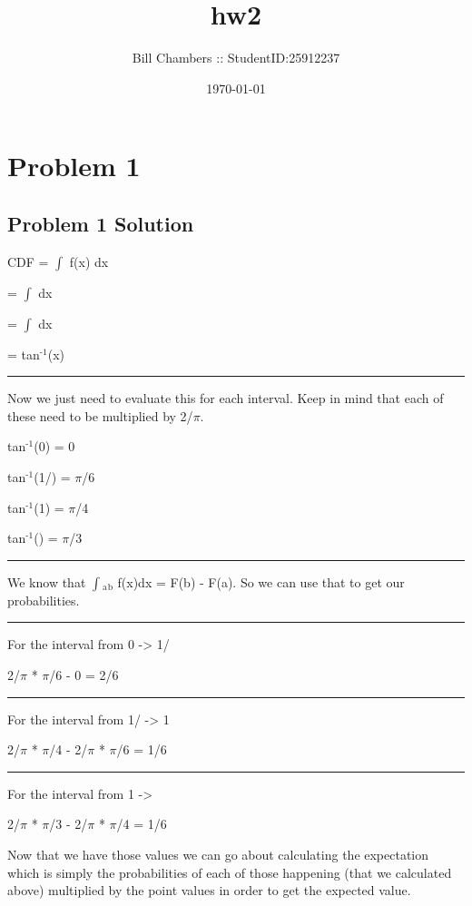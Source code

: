 \documentclass[11pt]{article}
\author{Bill Chambers :: StudentID:25912237}
\date{\today}
\title{hw2}
\begin{document}
\maketitle
\tableofcontents

\newpage

\section{Problem 1}
\label{sec-1}

\subsection{Problem 1 Solution}
\label{sec-1-1}
CDF = $\int$ f(x) dx

= $\int$ dx

= $\int$ dx

= tan$^{\text{-1}}$(x)

\rule{\linewidth}{0.5pt}

Now we just need to evaluate this for each interval. Keep in mind that each of these need to be multiplied by 2/$\pi$.

tan$^{\text{-1}}$(0) = 0

tan$^{\text{-1}}$(1/) = $\pi$/6

tan$^{\text{-1}}$(1) = $\pi$/4

tan$^{\text{-1}}$() = $\pi$/3

\rule{\linewidth}{0.5pt}

We know that $\int$$_{\text{a}}$$_{\text{b}}$ f(x)dx = F(b) - F(a). So we can use that to get our probabilities.

\rule{\linewidth}{0.5pt}

For the interval from 0 -> 1/

2/$\pi$ * $\pi$/6 - 0 = 2/6


\rule{\linewidth}{0.5pt}

For the interval from 1/ -> 1

2/$\pi$ * $\pi$/4 - 2/$\pi$ * $\pi$/6 = 1/6


\rule{\linewidth}{0.5pt}

For the interval from 1 -> 

2/$\pi$ * $\pi$/3 - 2/$\pi$ * $\pi$/4 = 1/6


Now that we have those values we can go about calculating the expectation which is simply the probabilities of each of those happening (that we calculated above) multiplied by the point values in order to get the expected value.
\end{document}
